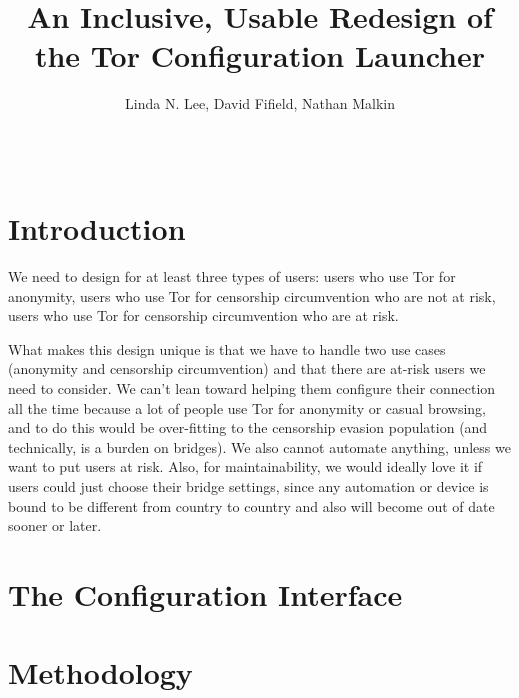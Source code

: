 \documentclass{template}
\begin{document}
\title{An Inclusive, Usable Redesign of the Tor Configuration Launcher}
\author{
 \alignauthor Linda N. Lee, David Fifield, Nathan Malkin \\
   \vspace{0.5em}
    \\
   \\
}
\maketitle

\begin{abstract}

\end{abstract}


\section{Introduction}
We need to design for at least three types of users: users who use Tor for anonymity, users who use Tor for censorship circumvention who are not at risk, users who use Tor for censorship circumvention who are at risk. 

What makes this design unique is that we have to handle two use cases (anonymity and censorship circumvention) and that there are at-risk users we need to consider. We can't lean toward helping them configure their connection all the time because a lot of people use Tor for anonymity or casual browsing, and to do this would be over-fitting to the censorship evasion population (and technically, is a burden on bridges). We also cannot automate anything, unless we want to put users at risk. Also, for maintainability, we would ideally love it if users could just choose their bridge settings, since any automation or device is bound to be different from country to country and also will become out of date sooner or later. 

\section{The Configuration Interface}

\section{Methodology}
\end{document}
